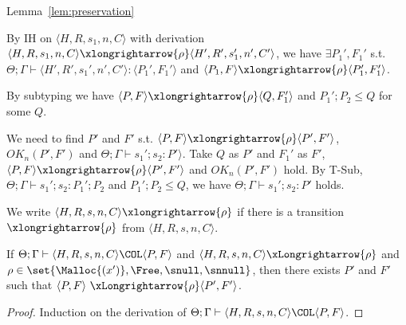 \begin{pfof}{Lemma~\ref{lem:preservation}}
\begin{itemize}
  By IH on \( \langle H, R, s_1, n, C \rangle \) with derivation \(
  \langle H, R, s_1, n, C \rangle \xlongrightarrow{\rho} \langle H',
  R', s_1', n', C' \rangle\), we have \(\exists P_1',F_1'\)
  s.t. \(\Theta; \Gamma \vdash \langle H', R', s_1', n', C' \rangle :
  \langle P_1', F_1' \rangle\) and \( \langle P_1, F \rangle
  \xlongrightarrow{\rho} \langle P_1', F_1' \rangle\).

  By subtyping we have \( \langle P, F \rangle \xlongrightarrow{\rho}
  \langle Q, F_1' \rangle \) and \(P_1';P_2 \le Q\) for some \(Q\).

  We need to find \(P'\) and \(F'\) s.t. \( \langle P, F \rangle
  \xlongrightarrow{\rho} \langle P', F' \rangle \), \( OK_n(P', F')\)
  and \(\Theta; \Gamma \vdash s_1';s_2 : P' \rangle\).  Take \(Q\) as
  \(P'\) and \(F_1'\) as \(F'\), \( \langle P, F \rangle
  \xlongrightarrow{\rho} \langle P', F' \rangle \) and \( OK_n(P',
  F')\) hold. By T-Sub, \(\Theta; \Gamma \vdash s_1';s_2 : P_1';P_2\)
  and \(P_1';P_2 \le Q\), we have \(\Theta; \Gamma \vdash s_1';s_2 :
  P'\) holds.

\end{itemize}
\end{pfof}  


We write \(\langle H, R, s, n, C \rangle \xlongrightarrow{\rho}\) if
there is a transition \(\xlongrightarrow{\rho}\) from \(\langle H, R,
s, n, C \rangle\).

\begin{lemma}
\label{lem:enabled}
If \(\Theta; \Gamma \vdash \langle H, R, s, n, C \rangle \COL \langle
P,F \rangle\) and \(\langle H, R, s, n, C \rangle
\xLongrightarrow{\rho}\) and \(\rho \in \set{\Malloc{(x')}, \Free, \snull, \snnull}\), then
there exists \(P'\) and \(F'\) such that \( \langle P, F \rangle
\ \xLongrightarrow{\rho} \langle P', F'\rangle\).
\end{lemma}

\begin{proof}
Induction on the derivation of \(\Theta; \Gamma \vdash \langle H, R, s, n, C \rangle \COL \langle P, F \rangle\).
\end{proof}

